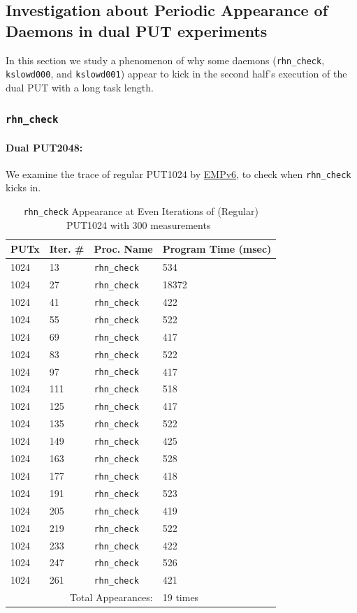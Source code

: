 \documentclass[10pt]{article}
\begin{document}
\clearpage
\newpage

\subsection{Investigation about Periodic Appearance of Daemons in dual PUT experiments}
In this section we study a phenomenon of why some daemons ({\tt rhn\_check}, {\tt kslowd000}, and {\tt kslowd001}) 
appear to kick in the second half's execution of the dual PUT with a long task length.
 
\subsubsection{{\tt rhn\_check}} 

\paragraph{Dual PUT2048:}
We examine the trace of regular PUT1024 by \underline{EMPv6}, to check when {\tt rhn\_check} kicks in. 

\begin{table}[htp!]
\centering
{
 \begin{tabular}{|l|l|l|l|} \hline
PUTx & Iter. \# & Proc. Name & Program Time (msec)\\ \hline
1024 & 13 & {\tt rhn\_check} & 534 \\ \hline
1024 & 27 & {\tt rhn\_check} & 18372 \\ \hline
1024 & 41 & {\tt rhn\_check} & 422 \\ \hline
1024 & 55 & {\tt rhn\_check} & 522 \\ \hline
1024 & 69 & {\tt rhn\_check} & 417 \\ \hline
1024 & 83 & {\tt rhn\_check} & 522 \\ \hline
1024 & 97 & {\tt rhn\_check} & 417 \\ \hline
1024 & 111 & {\tt rhn\_check} & 518 \\ \hline
1024 & 125 & {\tt rhn\_check} & 417 \\ \hline
1024 & 135 & {\tt rhn\_check} & 522 \\ \hline
1024 & 149 & {\tt rhn\_check} & 425 \\ \hline
1024 & 163 & {\tt rhn\_check} & 528 \\ \hline
1024 & 177 & {\tt rhn\_check} & 418 \\ \hline
1024 & 191 & {\tt rhn\_check} & 523 \\ \hline
1024 & 205 & {\tt rhn\_check} & 419 \\ \hline
1024 & 219 & {\tt rhn\_check} & 522 \\ \hline
1024 & 233 & {\tt rhn\_check} & 422 \\ \hline
1024 & 247 & {\tt rhn\_check} & 526 \\ \hline
1024 & 261 & {\tt rhn\_check} & 421 \\ \hline
\multicolumn{3}{|r|}{Total Appearances:} & 19 times\\ \hline
  \end{tabular}
  }
 \caption{{\tt rhn\_check} Appearance at Even Iterations of (Regular) PUT1024 with 300 measurements~\label{fig:rc_reg_put_1024_even}}
\end{table}
\end{document}
